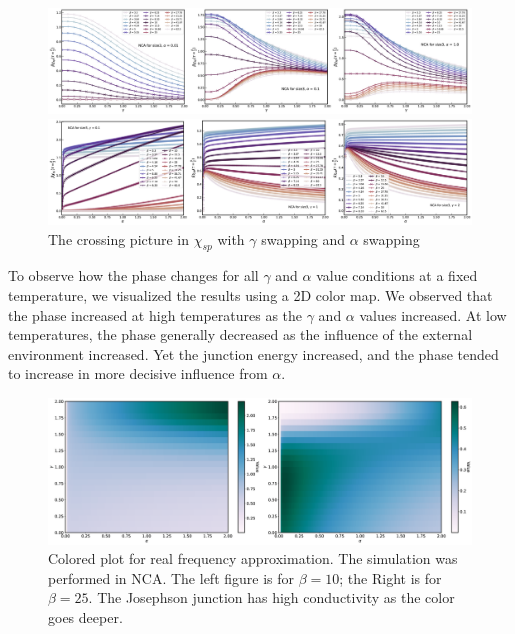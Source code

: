\documentclass{article}[12pt]
\numberwithin{equation}{section}
\begin{document}
\begin{spacing}{1.5}
\begin{figure}[H]
  \centerline{\includegraphics[width=15cm]{TexFigure/4/4_4_01_chi_gam_swp.png}}
  \centerline{\includegraphics[width=15cm]{TexFigure/4/4_4_02_chi_alp_swp.png}}
  \caption{The crossing picture in $\chi_{sp}$ with $\gamma$ swapping and $\alpha$ swapping}
\end{figure}
\pagebreak
To observe how the phase changes for all $\gamma$ and $\alpha$ value conditions at a fixed temperature, 
we visualized the results using a 2D color map.  
We observed that the phase increased at high temperatures as the $\gamma$ and $\alpha$ values increased. 
At low temperatures, the phase generally decreased as the influence of the external environment increased. 
Yet the junction energy increased, and the phase tended to increase in more decisive influence from $\alpha$.
\begin{figure}[H]
  \centerline{\includegraphics[width=13cm]{TexFigure/4/4_4_03_chi_color.png}}
  \caption{Colored plot for real frequency approximation. The simulation was performed in NCA. The left figure is for $\beta=10$; the Right is for $\beta=25$.
  The Josephson junction has high conductivity as the color goes deeper.}
 \end{figure}
\pagebreak

\end{spacing}
\end{document}
